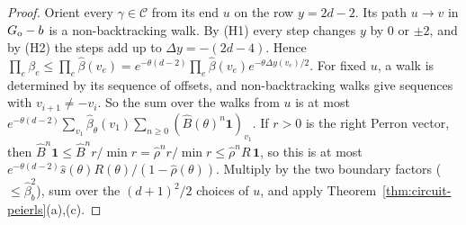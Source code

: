 \begin{proof}
Orient every $\gamma\in\mathcal C$ from its end $u$ on the row $y=2d-2$. Its path $u\to v$ in $G_{\rm o}-b$ is a non-backtracking walk. By (H1) every step changes $y$ by $0$ or $\pm2$, and by (H2) the steps add up to $\Delta y=-(2d-4)$. Hence
$\prod_{e}\beta_e\le\prod_e\hat\beta(v_e)=e^{-\theta(d-2)}\prod_e\hat\beta(v_e)e^{-\theta\Delta y(v_e)/2}$.
For fixed $u$, a walk is determined by its sequence of offsets, and non-backtracking walks give sequences with $v_{i+1}\ne-v_i$. So the sum over the walks from $u$ is at most
$e^{-\theta(d-2)}\sum_{v_1}\hat\beta_\theta(v_1)\sum_{n\ge0}(\hat B(\theta)^n\mathbf 1)_{v_1}$.
If $r>0$ is the right Perron vector, then $\hat B^n\mathbf 1\le\hat B^nr/\min r=\hat\rho^nr/\min r\le\hat\rho^nR\,\mathbf 1$, so this is at most $e^{-\theta(d-2)}\hat s(\theta)R(\theta)/(1-\hat\rho(\theta))$.
Multiply by the two boundary factors ($\le\hat\beta_b^2$), sum over the $(d+1)^2/2$ choices of $u$, and apply Theorem~\ref{thm:circuit-peierls}(a),(c).
\end{proof}

